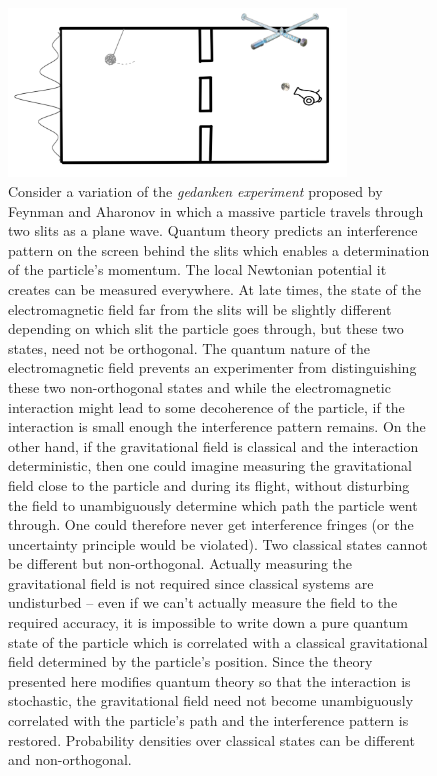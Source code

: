 \documentclass[aps,pra,showpacs,citeautoscript,amsmath,amssymb,floatfix,superscriptaddress,bbm, verbatim,amsfonts,changes,12pt,nofootinbib,longbibliography]{revtex4-2}
\begin{document}
\begin{figure}[h]
\includegraphics[width=0.8\textwidth]{doubleslit.png}
\caption{Consider a variation of the {\it gedanken experiment} proposed by Feynman\cite{cecile2011role,Feynman:1996kb-note} and Aharonov\cite{AharonovParadoxes-note} in which a massive particle travels through two slits as a plane wave. Quantum theory predicts an interference pattern on the screen behind the slits which enables a determination of the particle's momentum. 
The local Newtonian potential it creates can be measured everywhere. %
	At late times, the state of the electromagnetic field far from the slits will be slightly different depending on which slit the particle goes through, but these two states, need not be orthogonal. The quantum nature of the electromagnetic field prevents an experimenter from distinguishing these two non-orthogonal states and while the electromagnetic interaction might lead to some decoherence of the particle, if the interaction is small enough the interference pattern remains. On the other hand, if the gravitational field is classical and the interaction deterministic, then one could imagine measuring the gravitational field close to the particle and during its flight, without disturbing the field to unambiguously determine which path the particle went through. One could therefore never get interference fringes (or the uncertainty principle would be violated). Two classical states cannot be different but non-orthogonal. Actually measuring the gravitational field is not required since classical systems are undisturbed -- even if we can't actually measure the field to the required accuracy\cite{mattingly2006eppley}, it is impossible to write down a pure quantum state of the particle which is correlated with a classical gravitational field determined by the particle's position. Since the theory presented here modifies quantum theory so that the interaction is stochastic, the gravitational field need not become unambiguously correlated with the particle's path and the interference pattern is restored. Probability densities over classical states can be different and non-orthogonal.}
\label{fig:doubleslit}
\end{figure}
\end{document}
